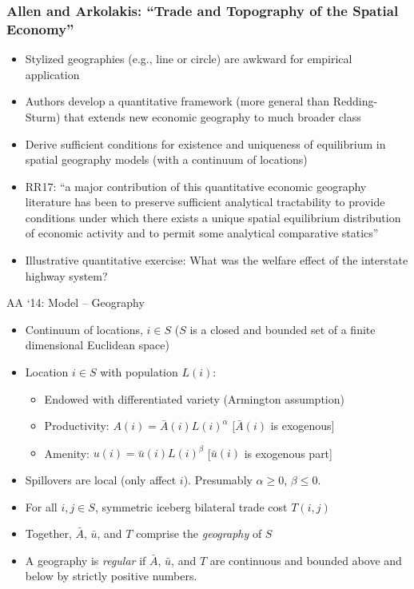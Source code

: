 \documentclass[11pt,notes=hide,aspectratio=169]{beamer}
\begin{document}
\begin{frame}
\frametitle{Allen and Arkolakis: ``Trade and Topography of the Spatial Economy''}
\begin{itemize}
\item Stylized geographies (e.g., line or circle) are awkward for empirical application
\item Authors develop a quantitative framework (more general than Redding-Sturm) that extends new economic geography to much broader class
\item Derive sufficient conditions for existence and uniqueness of equilibrium in spatial geography models (with a continuum of locations)
\item RR17: ``a major contribution of this quantitative economic geography literature has been to preserve sufficient analytical tractability to provide conditions under which there exists a unique spatial equilibrium distribution of economic activity and to permit some analytical comparative statics''
\item Illustrative quantitative exercise: What was the welfare effect of the interstate highway system?
\end{itemize}
\end{frame}
\begin{frame}{AA `14: Model -- Geography}
\begin{itemize}
\item Continuum of locations, $i \in S$ ($S$ is a closed and bounded set of a finite dimensional Euclidean space) 
\item Location $i \in S$ with population $L(i)$:
\begin{itemize}
\item Endowed with differentiated variety (Armington assumption)
\item Productivity: $A(i) = \bar{A}(i) L(i)^\alpha$ [$\bar{A}(i)$ is exogenous]
\item Amenity: $u(i) = \bar{u}\left(i\right) L(i)^\beta $ [$\bar{u}(i)$ is exogenous part]
\end{itemize}
\item Spillovers are local (only affect $i$). Presumably $\alpha \geq 0$, $\beta \leq 0$.
\item For all $i,j \in S$, symmetric iceberg bilateral trade cost $T\left(i,j\right)$
\item Together, $\bar{A}$, $\bar{u}$, and $T$ comprise the \textit{geography} of $S$
\item A geography is \textit{regular} if $\bar{A}$, $\bar{u}$, and $T$ are continuous and bounded above and below by strictly positive numbers.
\end{itemize}
\end{frame}
\end{document}
